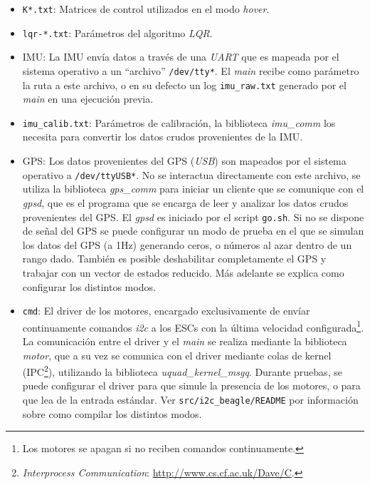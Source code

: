 \documentclass[main]{subfiles}
\begin{document}
\begin{itemize}
\item \verb+K*.txt+: Matrices de control utilizados en el modo \textit{hover}.
\item \verb+lqr-*.txt+: Par\'ametros del algoritmo \textit{LQR}.
\item IMU: La IMU env\'ia datos a trav\'es de una \textit{UART} que es mapeada por el sistema operativo a un ``archivo'' \verb+/dev/tty*+. El \textit{main} recibe como par\'ametro la ruta a este archivo, o en su defecto un log \verb+imu_raw.txt+ generado por el \textit{main} en una ejecuci\'on previa.
\item \verb+imu_calib.txt+: Par\'ametros de calibraci\'on, la biblioteca \textit{imu\_comm} los necesita para convertir los datos crudos provenientes de la IMU.
\item GPS: Los datos provenientes del GPS  (\textit{USB}) son mapeados por el sistema operativo a \verb+/dev/ttyUSB*+. No se interactua directamente con este archivo, se utiliza la biblioteca \textit{gps\_comm} para iniciar un cliente que se comunique con el \textit{gpsd}, que es el programa que se encarga de leer y analizar los datos crudos provenientes del GPS. El \textit{gpsd} es iniciado por el script \verb+go.sh+.\newline
Si no se dispone de se\~nal del GPS se puede configurar un modo de prueba en el que se simulan los datos del GPS (a 1Hz) generando ceros, o números al azar dentro de un rango dado. Tambi\'en es posible deshabilitar completamente el GPS y trabajar con un vector de estados reducido. M\'as adelante se explica como configurar los distintos modos.
\item \verb+cmd+: El driver de los motores, encargado exclusivamente de env\'iar continuamente comandos \textit{i2c} a los ESCs con la \'ultima velocidad configurada\footnote{Los motores se apagan si no reciben comandos continuamente.}. La comunicaci\'on entre el driver y el \textit{main} se realiza mediante la biblioteca \textit{motor}, que a su vez se comunica con el driver mediante colas de kernel (IPC\footnote{\textit{Interprocess Communication}: \url{http://www.cs.cf.ac.uk/Dave/C}.}), utilizando la biblioteca \textit{uquad\_kernel\_msgq}.\newline
Durante pruebas, se puede configurar el driver para que simule la presencia de los motores, o para que lea de la entrada est\'andar. Ver \verb+src/i2c_beagle/README+ por informaci\'on sobre como compilar los distintos modos.
\end{itemize}
\end{document}
